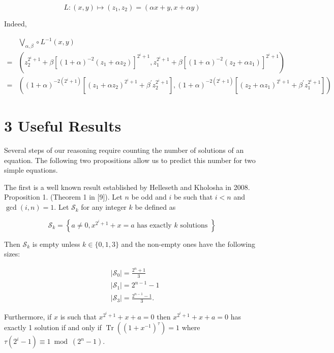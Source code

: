 \documentclass[10pt]{article}
\begin{document}
$$
L:(x, y) \mapsto\left(z_{1}, z_{2}\right)=(\alpha x+y, x+\alpha y)
$$

Indeed,

$$
\begin{aligned}
& \bigvee_{\alpha, \beta} \circ L^{-1}(x, y) \\
= & \left(z_{2}^{2^{i}+1}+\beta\left[(1+\alpha)^{-2}\left(z_{1}+\alpha z_{2}\right)\right]^{2^{i}+1}, z_{1}^{2^{i}+1}+\beta\left[(1+\alpha)^{-2}\left(z_{2}+\alpha z_{1}\right)\right]^{2^{i}+1}\right) \\
= & \left((1+\alpha)^{-2\left(2^{i}+1\right)}\left[\left(z_{1}+\alpha z_{2}\right)^{2^{i}+1}+\beta^{\prime} z_{2}^{2^{i}+1}\right],(1+\alpha)^{-2\left(2^{i}+1\right)}\left[\left(z_{2}+\alpha z_{1}\right)^{2^{i}+1}+\beta^{\prime} z_{1}^{2^{i}+1}\right]\right)
\end{aligned}
$$

\section*{3 Useful Results}
Several steps of our reasoning require counting the number of solutions of an equation. The following two propositions allow us to predict this number for two simple equations.

The first is a well known result established by Helleseth and Kholosha in 2008.\\[0pt]
Proposition 1. (Theorem 1 in [9]). Let $n$ be odd and $i$ be such that $i<n$ and $\operatorname{gcd}(i, n)=1$. Let $\mathcal{S}_{k}$ for any integer $k$ be defined as

$$
\mathcal{S}_{k}=\left\{a \neq 0, x^{2^{i}+1}+x=a \text { has exactly } k \text { solutions }\right\}
$$

Then $\mathcal{S}_{k}$ is empty unless $k \in\{0,1,3\}$ and the non-empty ones have the following sizes:

$$
\begin{aligned}
& \left|\mathcal{S}_{0}\right|=\frac{2^{n}+1}{3} \\
& \left|\mathcal{S}_{1}\right|=2^{n-1}-1 \\
& \left|\mathcal{S}_{3}\right|=\frac{2^{n-1}-1}{3} .
\end{aligned}
$$

Furthermore, if $x$ is such that $x^{2^{i}+1}+x+a=0$ then $x^{2^{i}+1}+x+a=0$ has exactly 1 solution if and only if $\operatorname{Tr}\left(\left(1+x^{-1}\right)^{\tau}\right)=1$ where $\tau\left(2^{i}-1\right) \equiv 1 \bmod \left(2^{n}-1\right)$.
\end{document}
